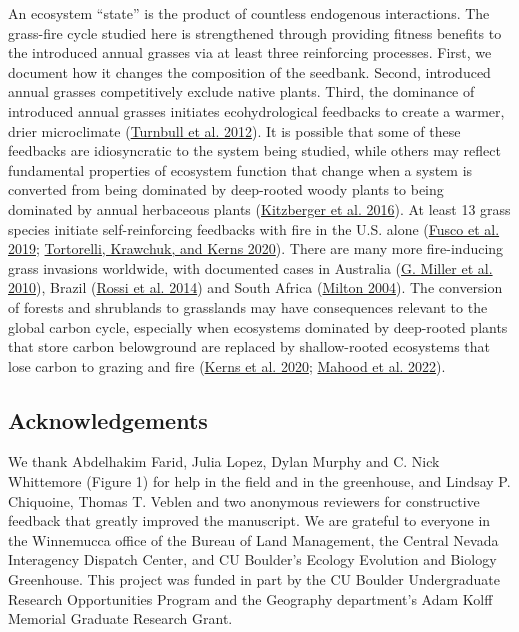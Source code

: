 \documentclass[
  12pt,
]{article}
\begin{document}
An ecosystem ``state'' is the product of countless endogenous
interactions. The grass-fire cycle studied here is strengthened through
providing fitness benefits to the introduced annual grasses via at least
three reinforcing processes. First, we document how it changes the
composition of the seedbank. Second, introduced annual grasses
competitively exclude native plants. Third, the dominance of introduced
annual grasses initiates ecohydrological feedbacks to create a warmer,
drier microclimate (\protect\hyperlink{ref-Turnbull2012}{Turnbull et al.
2012}). It is possible that some of these feedbacks are idiosyncratic to
the system being studied, while others may reflect fundamental
properties of ecosystem function that change when a system is converted
from being dominated by deep-rooted woody plants to being dominated by
annual herbaceous plants
(\protect\hyperlink{ref-Kitzberger2016}{Kitzberger et al. 2016}). At
least 13 grass species initiate self-reinforcing feedbacks with fire in
the U.S. alone (\protect\hyperlink{ref-Fusco2019}{Fusco et al. 2019};
\protect\hyperlink{ref-Tortorelli2020}{Tortorelli, Krawchuk, and Kerns
2020}). There are many more fire-inducing grass invasions worldwide,
with documented cases in Australia
(\protect\hyperlink{ref-Miller2010}{G. Miller et al. 2010}), Brazil
(\protect\hyperlink{ref-Rossi2014}{Rossi et al. 2014}) and South Africa
(\protect\hyperlink{ref-Milton2004}{Milton 2004}). The conversion of
forests and shrublands to grasslands may have consequences relevant to
the global carbon cycle, especially when ecosystems dominated by
deep-rooted plants that store carbon belowground are replaced by
shallow-rooted ecosystems that lose carbon to grazing and fire
(\protect\hyperlink{ref-Kerns2020}{Kerns et al. 2020};
\protect\hyperlink{ref-Mahood2021}{Mahood et al. 2022}).

\hypertarget{acknowledgements}{%
\subsection{Acknowledgements}\label{acknowledgements}}

We thank Abdelhakim Farid, Julia Lopez, Dylan Murphy and C. Nick
Whittemore (Figure 1) for help in the field and in the greenhouse, and
Lindsay P. Chiquoine, Thomas T. Veblen and two anonymous reviewers for
constructive feedback that greatly improved the manuscript. We are
grateful to everyone in the Winnemucca office of the Bureau of Land
Management, the Central Nevada Interagency Dispatch Center, and CU
Boulder's Ecology Evolution and Biology Greenhouse. This project was
funded in part by the CU Boulder Undergraduate Research Opportunities
Program and the Geography department's Adam Kolff Memorial Graduate
Research Grant.
\end{document}
